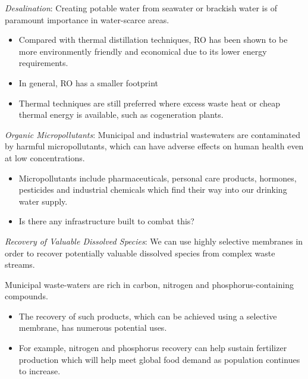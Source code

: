   \textit{Desalination}:
  Creating potable water from seawater or brackish water is of paramount importance
  in water-scarce areas. 
  \begin{itemize}
  	\item Compared with thermal distillation techniques, RO has been shown to 
  	be more environmently friendly and economical due to its lower energy
  	requirements.\cite{morton_environmental_1997}
 	\item In general, RO has a smaller footprint %
  	\item Thermal techniques are still preferred where excess waste heat or cheap 
  	thermal energy is available, such as cogeneration plants.\cite{bhojwani_technology_2019}
  \end{itemize}

  \textit{Organic Micropollutants}:
  Municipal and industrial wastewaters are contaminated by harmful
  micropollutants, which can have adverse effects on human health even at low 
  concentrations.\cite{schwarzenbach_challenge_2006}
  \begin{itemize}
    \item Micropollutants include pharmaceuticals, personal care products, 
    hormones, pesticides and industrial chemicals which find their way into
    our drinking water supply.
    \item Is there any infrastructure built to combat this?
  \end{itemize}
  
  \textit{Recovery of Valuable Dissolved Species}: We can use highly selective
  membranes in order to recover potentially valuable dissolved species from 
  complex waste streams. 
  
  Municipal waste-waters are rich in carbon, nitrogen and phosphorus-containing 
  compounds. %
  \begin{itemize}  
    \item The recovery of such products, which can be achieved using a 
    selective membrane, has numerous potential uses.\cite{sales_resource_2015}
    \item For example, nitrogen and phosphorus recovery can help sustain fertilizer 
    production which will help meet global food demand as population continues
    to increase.\cite{xie_membrane-based_2016}
  \end{itemize}

